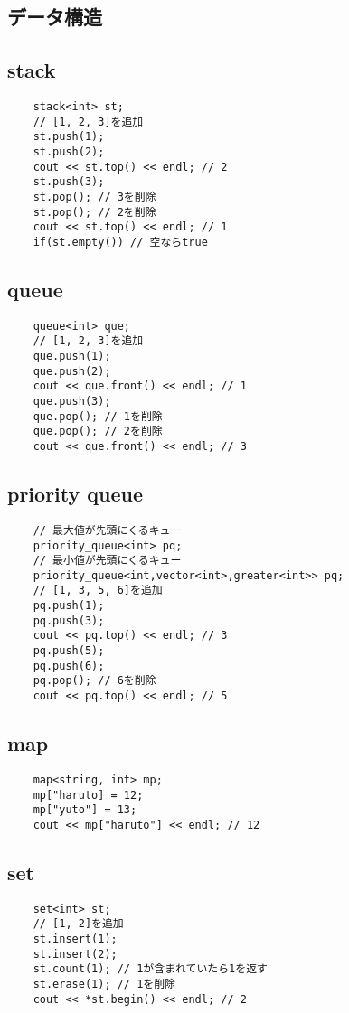 \documentclass[a4paper, landscape, 9pt]{jarticle} %
\begin{document}
\begin{multicols*}{3}
    \section{データ構造}
    \subsection{stack}
    \begin{lstlisting}
    stack<int> st;
    // [1, 2, 3]を追加
    st.push(1);
    st.push(2);
    cout << st.top() << endl; // 2
    st.push(3);
    st.pop(); // 3を削除
    st.pop(); // 2を削除
    cout << st.top() << endl; // 1
    if(st.empty()) // 空ならtrue
    \end{lstlisting}

    \subsection{queue}
    \begin{lstlisting}
    queue<int> que;
    // [1, 2, 3]を追加
    que.push(1);
    que.push(2);
    cout << que.front() << endl; // 1
    que.push(3);
    que.pop(); // 1を削除
    que.pop(); // 2を削除
    cout << que.front() << endl; // 3
    \end{lstlisting}

    \subsection{priority queue}
    \begin{lstlisting}
    // 最大値が先頭にくるキュー
    priority_queue<int> pq;
    // 最小値が先頭にくるキュー
    priority_queue<int,vector<int>,greater<int>> pq;
    // [1, 3, 5, 6]を追加
    pq.push(1);
    pq.push(3);
    cout << pq.top() << endl; // 3
    pq.push(5);
    pq.push(6);
    pq.pop(); // 6を削除
    cout << pq.top() << endl; // 5
    \end{lstlisting}

    \subsection{map}
    \begin{lstlisting}
    map<string, int> mp;
    mp["haruto] = 12;
    mp["yuto"] = 13;
    cout << mp["haruto"] << endl; // 12
    \end{lstlisting}

    \subsection{set}
    \begin{lstlisting}
    set<int> st;
    // [1, 2]を追加
    st.insert(1);
    st.insert(2);
    st.count(1); // 1が含まれていたら1を返す
    st.erase(1); // 1を削除
    cout << *st.begin() << endl; // 2
    \end{lstlisting}


\end{multicols*}
\end{document}
